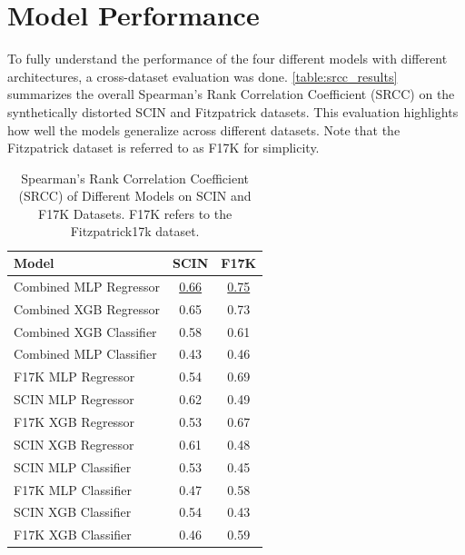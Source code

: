 \section{Model Performance}
\label{sec:ModelPerformance}
To fully understand the performance of the four different models with different architectures, a cross-dataset evaluation was done. \autoref{table:srcc_results} summarizes the overall Spearman’s Rank Correlation Coefficient (SRCC) on the synthetically distorted SCIN and Fitzpatrick datasets. This evaluation highlights how well the models generalize across different datasets. Note that the Fitzpatrick dataset is referred to as F17K for simplicity. \par 
\begin{table}[h]
    \centering
    \begin{tabular}{|l|c|c|}
        \hline
        \textbf{Model} & \textbf{SCIN} & \textbf{F17K} \\
        \hline
        Combined MLP Regressor & \underline{0.66} & \underline{0.75} \\
        Combined XGB Regressor & 0.65 & 0.73 \\
        Combined XGB Classifier & 0.58 & 0.61 \\
        Combined MLP Classifier & 0.43 & 0.46 \\
        \hline
        F17K MLP Regressor & 0.54 & 0.69 \\
        SCIN MLP Regressor & 0.62 & 0.49 \\
        F17K XGB Regressor & 0.53 & 0.67 \\
        SCIN XGB Regressor & 0.61 & 0.48 \\
        SCIN MLP Classifier & 0.53 & 0.45 \\
        F17K MLP Classifier & 0.47 & 0.58 \\
        SCIN XGB Classifier & 0.54 & 0.43 \\
        F17K XGB Classifier & 0.46 & 0.59 \\
        \hline
    \end{tabular}
    \caption{Spearman’s Rank Correlation Coefficient (SRCC) of Different Models on SCIN and F17K Datasets. F17K refers to the Fitzpatrick17k dataset.}
    \label{table:srcc_results}
\end{table}
